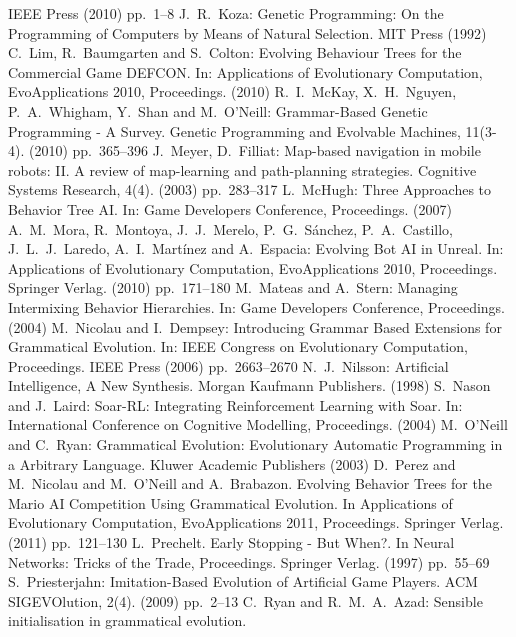 \documentclass[conference]{IEEEtran}
\begin{document}
\begin{thebibliography}{11}
	IEEE Press (2010)
	pp.~1--8
	J.~R.~Koza:
	Genetic Programming: On the Programming of Computers by Means of Natural Selection.
	MIT Press (1992)
	C.~Lim, R.~Baumgarten and S.~Colton:
	Evolving Behaviour Trees for the Commercial Game DEFCON.
	In: Applications of Evolutionary Computation, EvoApplications 2010, Proceedings. (2010)
	R.~I.~McKay, X.~H.~Nguyen, P.~A.~Whigham, Y.~Shan and M.~O'Neill:
	Grammar-Based Genetic Programming - A Survey.
	Genetic Programming and Evolvable Machines, 11(3-4). (2010)
	pp.~365--396
	J.~Meyer, D.~Filliat:
	Map-based navigation in mobile robots: II. A review of map-learning 
	and path-planning strategies.
	Cognitive Systems Research, 4(4). (2003)
	pp.~283--317
	L.~McHugh:
	Three Approaches to Behavior Tree AI.
	In: Game Developers Conference, Proceedings. (2007)
	A.~M.~Mora, R.~Montoya, J.~J.~Merelo, P.~G.~S\'anchez, P.~A.~Castillo,
	J.~L.~J.~Laredo, A.~I.~Mart\'inez and A.~Espacia:
	Evolving Bot AI in Unreal.
	In: Applications of Evolutionary Computation, EvoApplications 2010, Proceedings.
	Springer Verlag. (2010)
	pp.~171--180
	M.~Mateas and A.~Stern:
	Managing Intermixing Behavior Hierarchies.
	In: Game Developers Conference, Proceedings. (2004)
	M.~Nicolau and I.~Dempsey:
	Introducing Grammar Based Extensions for Grammatical Evolution.
	In: IEEE Congress on Evolutionary Computation, Proceedings.
	IEEE Press (2006)
	pp.~2663--2670
	N.~J.~Nilsson:
	Artificial Intelligence, A New Synthesis.
	Morgan Kaufmann Publishers. (1998)
	S.~Nason and J.~Laird:
	Soar-RL: Integrating Reinforcement Learning with Soar.
	In: International Conference on Cognitive Modelling, Proceedings. (2004)
	M.~O'Neill and C.~Ryan:
	Grammatical Evolution: Evolutionary Automatic Programming in a Arbitrary Language.
	Kluwer Academic Publishers (2003)
	D.~Perez and M.~Nicolau and M.~O'Neill and A.~Brabazon.
	Evolving Behavior Trees for the Mario AI Competition Using Grammatical Evolution.
	In Applications of Evolutionary Computation, EvoApplications 2011, Proceedings.
	Springer Verlag. (2011)
	pp.~121--130
	L.~Prechelt.
	Early Stopping - But When?.
	In Neural Networks: Tricks of the Trade, Proceedings.
	Springer Verlag. (1997)
	pp.~55--69
	S.~Priesterjahn:
	Imitation-Based Evolution of Artificial Game Players.
	ACM SIGEVOlution, 2(4). (2009)
	pp.~2--13
	C.~Ryan and R.~M.~A.~Azad:
	Sensible initialisation in grammatical evolution.

\end{thebibliography}
\end{document}
